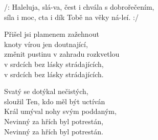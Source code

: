
\cho{}
/: Haleluja,   slá-va, čest i chvála s dobrořečením, \\
síla i moc, cta i dík Tobě na věky ná-leí. :/

\ve{}
Přišel jsi plamenem zažehnout \\
knoty vírou jen doutnající, \\
změnit pustinu v zahradu rozkvetlou \\
v srdcích bez lásky strádajících, \\
v srdcích bez lásky strádajících.

\cho{}

\ve{}
Svatý se dotýkal nečistých, \\
sloužil Ten, kdo měl být uctíván \\
Král umýval nohy svým poddaným, \\
Nevinný za hřích byl potrestán, \\
Nevinný za hřích byl potrestán.

\cho{}

\esong
